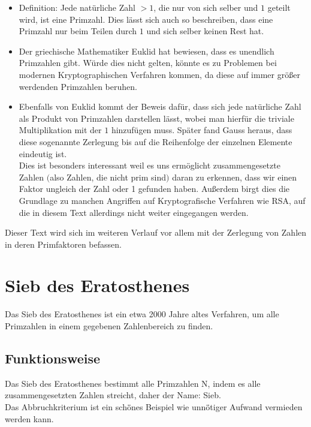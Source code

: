\documentclass[12pt, a4paper, titlepage,twoside]{article}
\begin{document}
	\begin{itemize}
		\item Definition: Jede nat\"urliche Zahl $>1$, die nur von sich selber und  $1$ geteilt wird, ist eine Primzahl. Dies l\"asst sich auch so beschreiben, dass eine Primzahl nur beim Teilen durch $1$ und sich selber keinen Rest hat.
		\item Der griechische Mathematiker Euklid hat bewiesen, dass es unendlich Primzahlen gibt. W\"urde dies nicht gelten, k\"onnte es zu Problemen bei modernen Kryptographischen Verfahren kommen, da diese auf immer gr\"oßer werdenden Primzahlen beruhen. 
		\item  Ebenfalls von Euklid kommt der Beweis daf\"ur, dass sich jede nat\"urliche Zahl als Produkt von Primzahlen darstellen l\"asst, wobei man hierf\"ur die triviale Multiplikation mit der $1$ hinzuf\"ugen muss. Sp\"ater fand Gauss heraus, dass diese sogenannte Zerlegung bis auf die Reihenfolge der einzelnen Elemente eindeutig ist. \\
		Dies ist besonders interessant weil es uns erm\"oglicht zusammengesetzte Zahlen $($also Zahlen, die nicht prim sind$)$ daran zu erkennen, dass wir einen Faktor ungleich der Zahl oder 1 gefunden haben. Außerdem birgt dies die Grundlage zu manchen Angriffen auf Kryptografische Verfahren wie RSA, auf die in diesem Text allerdings nicht weiter eingegangen werden.
	\end{itemize}
	
	Dieser Text wird sich im weiteren Verlauf vor allem mit der Zerlegung von Zahlen in deren Primfaktoren befassen. 

 

		
	\section{Sieb des Eratosthenes} \label{Sieb des Eratosthenes}
	Das Sieb des Eratosthenes ist ein etwa 2000 Jahre altes Verfahren, um alle Primzahlen in einem gegebenen Zahlenbereich zu finden. 
	\subsection{Funktionsweise}
	Das Sieb des Eratosthenes bestimmt alle Primzahlen N, indem es alle zusammengesetzten Zahlen streicht, daher der Name: Sieb.\\
	Das Abbruchkriterium ist ein sch\"önes Beispiel wie unn\"ötiger Aufwand vermieden werden kann.
\end{document}
